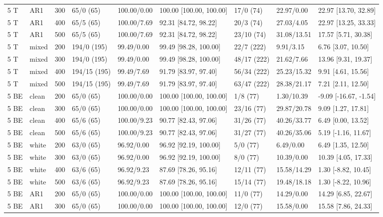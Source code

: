 \documentclass[10pt]{article}
\begin{document}
\begin{longtable}{@{}lllllllll@{}}
5 T & AR1 & 300 & 65/0 (65) & 100.00/0.00 & 100.00 [100.00, 100.00] & 17/0 (74) & 22.97/0.00 & 22.97 [13.70, 32.89] \\
5 T & AR1 & 400 & 65/5 (65) & 100.00/7.69 & 92.31 [84.72, 98.22] & 20/3 (74) & 27.03/4.05 & 22.97 [13.25, 33.33] \\
5 T & AR1 & 500 & 65/5 (65) & 100.00/7.69 & 92.31 [84.72, 98.22] & 23/10 (74) & 31.08/13.51 & 17.57 [5.71, 30.38] \\
5 T & mixed & 200 & 194/0 (195) & 99.49/0.00 & 99.49 [98.28, 100.00] & 22/7 (222) & 9.91/3.15 & 6.76 [3.07, 10.50] \\
5 T & mixed & 300 & 194/0 (195) & 99.49/0.00 & 99.49 [98.28, 100.00] & 48/17 (222) & 21.62/7.66 & 13.96 [9.31, 19.37] \\
5 T & mixed & 400 & 194/15 (195) & 99.49/7.69 & 91.79 [83.97, 97.40] & 56/34 (222) & 25.23/15.32 & 9.91 [4.61, 15.56] \\
5 T & mixed & 500 & 194/15 (195) & 99.49/7.69 & 91.79 [83.97, 97.40] & 63/47 (222) & 28.38/21.17 & 7.21 [2.11, 12.50] \\
5 BE & clean & 200 & 65/0 (65) & 100.00/0.00 & 100.00 [100.00, 100.00] & 1/8 (77) & 1.30/10.39 & -9.09 [-16.67, -1.54] \\
5 BE & clean & 300 & 65/0 (65) & 100.00/0.00 & 100.00 [100.00, 100.00] & 23/16 (77) & 29.87/20.78 & 9.09 [1.27, 17.81] \\
5 BE & clean & 400 & 65/6 (65) & 100.00/9.23 & 90.77 [82.43, 97.06] & 31/26 (77) & 40.26/33.77 & 6.49 [0.00, 13.52] \\
5 BE & clean & 500 & 65/6 (65) & 100.00/9.23 & 90.77 [82.43, 97.06] & 31/27 (77) & 40.26/35.06 & 5.19 [-1.16, 11.67] \\
5 BE & white & 200 & 63/0 (65) & 96.92/0.00 & 96.92 [92.19, 100.00] & 5/0 (77) & 6.49/0.00 & 6.49 [1.35, 12.50] \\
5 BE & white & 300 & 63/0 (65) & 96.92/0.00 & 96.92 [92.19, 100.00] & 8/0 (77) & 10.39/0.00 & 10.39 [4.05, 17.33] \\
5 BE & white & 400 & 63/6 (65) & 96.92/9.23 & 87.69 [78.26, 95.16] & 12/11 (77) & 15.58/14.29 & 1.30 [-8.82, 10.45] \\
5 BE & white & 500 & 63/6 (65) & 96.92/9.23 & 87.69 [78.26, 95.16] & 15/14 (77) & 19.48/18.18 & 1.30 [-8.22, 10.96] \\
5 BE & AR1 & 200 & 65/0 (65) & 100.00/0.00 & 100.00 [100.00, 100.00] & 11/0 (77) & 14.29/0.00 & 14.29 [6.85, 22.67] \\
5 BE & AR1 & 300 & 65/0 (65) & 100.00/0.00 & 100.00 [100.00, 100.00] & 12/0 (77) & 15.58/0.00 & 15.58 [7.86, 24.33] \\

\end{longtable}
\end{document}
